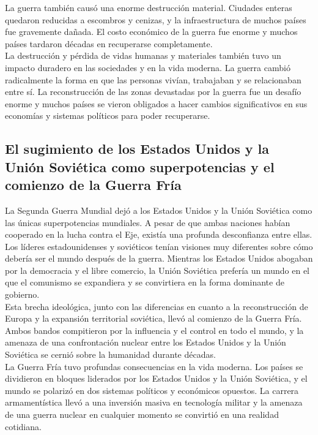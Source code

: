 \documentclass{article}
\theoremstyle{mytheoremstyle}
\theoremstyle{mytheoremstyle}
\theoremstyle{myproblemstyle}
\begin{document}
La guerra también causó una enorme destrucción material. Ciudades enteras quedaron reducidas a escombros y cenizas, y la infraestructura de muchos países fue gravemente dañada. El costo económico de la guerra fue enorme y muchos países tardaron décadas en recuperarse completamente.\\

La destrucción y pérdida de vidas humanas y materiales también tuvo un impacto duradero en las sociedades y en la vida moderna. La guerra cambió radicalmente la forma en que las personas vivían, trabajaban y se relacionaban entre sí. La reconstrucción de las zonas devastadas por la guerra fue un desafío enorme y muchos países se vieron obligados a hacer cambios significativos en sus economías y sistemas políticos para poder recuperarse.\\

\subsection{El sugimiento de los Estados Unidos y la Unión Soviética como superpotencias y el comienzo de la Guerra Fría}

La Segunda Guerra Mundial dejó a los Estados Unidos y la Unión Soviética como las únicas superpotencias mundiales. A pesar de que ambas naciones habían cooperado en la lucha contra el Eje, existía una profunda desconfianza entre ellas. Los líderes estadounidenses y soviéticos tenían visiones muy diferentes sobre cómo debería ser el mundo después de la guerra. Mientras los Estados Unidos abogaban por la democracia y el libre comercio, la Unión Soviética prefería un mundo en el que el comunismo se expandiera y se convirtiera en la forma dominante de gobierno.\\

Esta brecha ideológica, junto con las diferencias en cuanto a la reconstrucción de Europa y la expansión territorial soviética, llevó al comienzo de la Guerra Fría. Ambos bandos compitieron por la influencia y el control en todo el mundo, y la amenaza de una confrontación nuclear entre los Estados Unidos y la Unión Soviética se cernió sobre la humanidad durante décadas.\\

La Guerra Fría tuvo profundas consecuencias en la vida moderna. Los países se dividieron en bloques liderados por los Estados Unidos y la Unión Soviética, y el mundo se polarizó en dos sistemas políticos y económicos opuestos. La carrera armamentística llevó a una inversión masiva en tecnología militar y la amenaza de una guerra nuclear en cualquier momento se convirtió en una realidad cotidiana.\\
\end{document}
